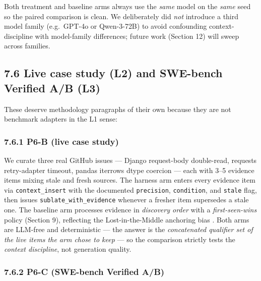 Both treatment and baseline arms always use the \emph{same} model on the \emph{same} seed so the paired comparison is clean. We deliberately did \emph{not} introduce a third model family (e.g.~GPT-4o or Qwen-3-72B) to avoid confounding context-discipline with model-family differences; future work (Section 12) will sweep across families.

\subsection{7.6 Live case study (L2) and SWE-bench Verified A/B (L3)}\label{live-case-study-l2-and-swe-bench-verified-ab-l3}

These deserve methodology paragraphs of their own because they are not benchmark adapters in the L1 sense:

\subsubsection{7.6.1 P6-B (live case study)}\label{p6-b-live-case-study}

We curate three real GitHub issues --- Django request-body double-read, requests retry-adapter timeout, pandas iterrows dtype coercion --- each with 3--5 evidence items mixing stale and fresh sources. The harness arm enters every evidence item via \texttt{context\_insert} with the documented \texttt{precision}, \texttt{condition}, and \texttt{stale} flag, then issues \texttt{sublate\_with\_evidence} whenever a fresher item supersedes a stale one. The baseline arm processes evidence in \emph{discovery order} with a \emph{first-seen-wins} policy (Section 9), reflecting the Lost-in-the-Middle anchoring bias \citep{liu2023lostmiddle}. Both arms are LLM-free and deterministic --- the answer is the \emph{concatenated qualifier set of the live items the arm chose to keep} --- so the comparison strictly tests the \emph{context discipline}, not generation quality.

\subsubsection{7.6.2 P6-C (SWE-bench Verified A/B)}\label{p6-c-swe-bench-verified-ab}

